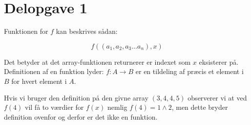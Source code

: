 \section{Delopgave 1}\label{sec:delopgave-12}

Funktionen for \(f\) kan beskrives sådan:

\begin{equation}
    f((a_{1}, a_{2}, a_{3} \dots a_{n}), x)
    \label{eq:equation12}
\end{equation}

Det betyder at det array-funktionen returnerer er indexet som \(x\) eksisterer på.
Definitionen af en funktion lyder: \(f: A \rightarrow B\) er en tildeling af præcis et element i \(B\) for hvert element
i \(A\).

Hvis vi bruger den definition på den givne array \(\left(3, 4, 4, 5\right)\) observerer vi at ved \(f(4)\) vil få to
værdier for \(f(x)\) nemlig \(f(4) = 1 \wedge 2\), men dette bryder definition ovenfor og derfor er det ikke en
funktion.
